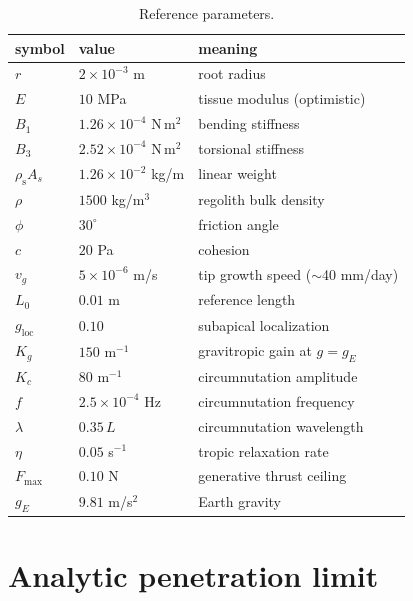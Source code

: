 \documentclass[preprint,12pt]{elsarticle}
\begin{document}
\begin{table}[t]
\centering
\caption{Reference parameters.}
\label{tab:params}
\begin{tabular}{lll}
\toprule
symbol & value & meaning \\
\midrule
$r$ & $2\times10^{-3}$ m & root radius \\
$E$ & $10$ MPa & tissue modulus (optimistic) \\
$B_1$ & $1.26\times10^{-4}$ N\,m$^2$ & bending stiffness \\
$B_3$ & $2.52\times10^{-4}$ N\,m$^2$ & torsional stiffness \\
$\rho_{\mathrm{s}}A_s$ & $1.26\times10^{-2}$ kg/m & linear weight \\
$\rho$ & $1500$ kg/m$^3$ & regolith bulk density \\
$\phi$ & $30^\circ$ & friction angle \\
$c$ & $20$ Pa & cohesion \\
$v_g$ & $5\times10^{-6}$ m/s & tip growth speed ($\sim$40 mm/day) \\
$L_0$ & $0.01$ m & reference length \\
$g_{\mathrm{loc}}$ & $0.10$ & subapical localization \\
$K_g$ & $150$ m$^{-1}$ & gravitropic gain at $g=g_E$ \\
$K_c$ & $80$ m$^{-1}$ & circumnutation amplitude \\
$f$ & $2.5\times10^{-4}$ Hz & circumnutation frequency \\
$\lambda$ & $0.35\,L$ & circumnutation wavelength \\
$\eta$ & $0.05$ s$^{-1}$ & tropic relaxation rate \\
$F_{\max}$ & $0.10$ N & generative thrust ceiling \\
$g_E$ & $9.81$ m/s$^2$ & Earth gravity \\
\bottomrule
\end{tabular}
\end{table}

\section{Analytic penetration limit}
\label{sec:analytic}
\end{document}
